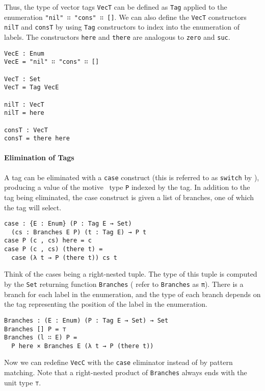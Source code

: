 \documentclass[nonatbib]{sigplanconf}
\begin{document}
Thus, the type of vector tags {\tt VecT} can be defined as
{\tt Tag} applied to the enumeration {\tt "nil" ∷ "cons" ∷ []}.
We can also define the {\tt VecT} constructors
{\tt nilT} and {\tt consT} by using
{\tt Tag} constructors to index into the enumeration of labels. The
constructors {\tt here} and {\tt there} are analogous to {\tt zero}
and {\tt suc}.

\begin{verbatim}
VecE : Enum
VecE = "nil" ∷ "cons" ∷ []

VecT : Set
VecT = Tag VecE

nilT : VecT
nilT = here

consT : VecT
consT = there here
\end{verbatim}

\paragraph{Elimination of Tags}

A tag can be eliminated with a {\tt case} construct (this is referred to
as {\tt switch} by \citet{Chapman:2010:GAL:1932681.1863547,dagand:phd}),
producing a value of the motive~\citep{McBride:2000:EM:646540.759262} 
type {\tt P} indexed by the tag.
In addition to the tag being eliminated, the case construct is given a
list of branches, one of which the tag will select.

\begin{verbatim}
case : {E : Enum} (P : Tag E → Set)
  (cs : Branches E P) (t : Tag E) → P t
case P (c , cs) here = c
case P (c , cs) (there t) =
  case (λ t → P (there t)) cs t
\end{verbatim}

Think of the cases being a right-nested tuple. The type of this tuple
is computed by the {\tt Set} returning function {\tt Branches}
(\citet{Chapman:2010:GAL:1932681.1863547,dagand:phd} refer to 
{\tt Branches} as {\tt π}).
There is a branch for each label in the enumeration, and the type of
each branch depends on the tag representing the position of the label
in the enumeration.

\begin{verbatim}
Branches : (E : Enum) (P : Tag E → Set) → Set
Branches [] P = ⊤
Branches (l ∷ E) P =
  P here × Branches E (λ t → P (there t))
\end{verbatim}

Now we can redefine {\tt VecC} with the {\tt case} eliminator instead
of by pattern matching. Note that a right-nested product of
{\tt Branches} always ends with the unit type {\tt ⊤}.
\end{document}
